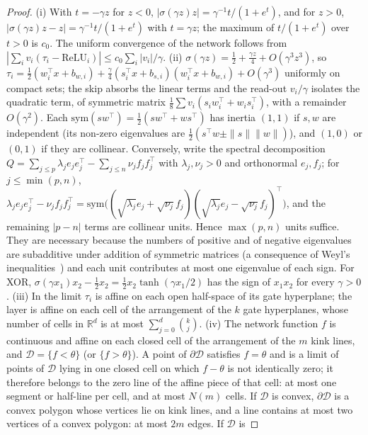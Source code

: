 \documentclass[11pt,a4paper]{article}
\theoremstyle{plain}
\theoremstyle{definition}
\theoremstyle{remark}
\newcommand{\R}{\mathbb R}
\newcommand{\T}{\top}
\begin{document}
\begin{proof}
(i) With $t=-\gamma z$ for $z<0$, $|\sigma(\gamma z)z|=\gamma^{-1}t/(1+e^t)$,
and for $z>0$, $|\sigma(\gamma z)z-z|=\gamma^{-1}t/(1+e^t)$ with
$t=\gamma z$; the maximum of $t/(1+e^t)$ over $t>0$ is $c_0$. The uniform
convergence of the network follows from
$|\sum_iv_i(\tau_i-\mathrm{ReLU}_i)|\le c_0\sum_i|v_i|/\gamma$.
(ii) $\sigma(\gamma z)=\tfrac12+\tfrac{\gamma z}4+O(\gamma^3z^3)$, so
$\tau_i=\tfrac12(w_i^\T x+b_{w,i})+\tfrac\gamma4(s_i^\T x+b_{s,i})(w_i^\T x+b_{w,i})+O(\gamma^3)$
uniformly on compact sets; the skip absorbs the linear terms and the
read-out $v_i/\gamma$ isolates the quadratic term, of symmetric matrix
$\tfrac18\sum v_i(s_iw_i^\T+w_is_i^\T)$, with a remainder $O(\gamma^2)$.
Each $\mathrm{sym}(sw^\T)=\tfrac12(sw^\T+ws^\T)$ has inertia $(1,1)$ if $s,w$
are independent (its non-zero eigenvalues are
$\tfrac12(s^\T w\pm\|s\|\|w\|)$), and $(1,0)$ or $(0,1)$ if they are
collinear. Conversely, write the spectral decomposition
$Q=\sum_{j\le p}\lambda_je_je_j^\T-\sum_{j\le n}\nu_jf_jf_j^\T$ with
$\lambda_j,\nu_j>0$ and orthonormal $e_j,f_j$; for $j\le\min(p,n)$,
$\lambda_je_je_j^\T-\nu_jf_jf_j^\T=\mathrm{sym}\bigl((\sqrt{\lambda_j}e_j+\sqrt{\nu_j}f_j)(\sqrt{\lambda_j}e_j-\sqrt{\nu_j}f_j)^\T\bigr)$,
and the remaining $|p-n|$ terms are collinear units. Hence $\max(p,n)$ units
suffice. They are necessary because the numbers of positive and of negative
eigenvalues are subadditive under addition of symmetric matrices (a
consequence of Weyl's inequalities~\cite{hornjohnson2013}) and each unit
contributes at most one eigenvalue of each sign. For XOR,
$\sigma(\gamma x_1)x_2-\tfrac12x_2=\tfrac12x_2\tanh(\gamma x_1/2)$ has the
sign of $x_1x_2$ for every $\gamma>0$.
(iii) In the limit $\tau_i$ is affine on each open half-space of its gate
hyperplane; the layer is affine on each cell of the arrangement of the $k$
gate hyperplanes, whose number of cells in $\R^d$ is at most
$\sum_{j=0}^d\binom kj$.
(iv) The network function $f$ is continuous and affine on each closed cell
of the arrangement of the $m$ kink lines, and $\mathcal D=\{f<\theta\}$ (or
$\{f>\theta\}$). A point of $\partial\mathcal D$ satisfies $f=\theta$ and is
a limit of points of $\mathcal D$ lying in one closed cell on which
$f-\theta$ is not identically zero; it therefore belongs to the zero line of
the affine piece of that cell: at most one segment or half-line per cell,
and at most $N(m)$ cells. If $\mathcal D$ is convex, $\partial\mathcal D$ is a convex
polygon whose vertices lie on kink lines, and a line contains at most two
vertices of a convex polygon: at most $2m$ edges. If $\mathcal D$ is

\end{proof}
\end{document}
